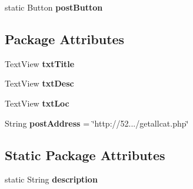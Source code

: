 \begin{DoxyCompactItemize}
\begin{DoxyCompactItemize}
\item 
\hypertarget{classcom_1_1example_1_1sel_1_1lostfound_1_1PostFragment_ab2d93225b515c22ccd209e1382e1a4a1}{static \-Button {\bfseries post\-Button}}\label{classcom_1_1example_1_1sel_1_1lostfound_1_1PostFragment_ab2d93225b515c22ccd209e1382e1a4a1}

\end{DoxyCompactItemize}
\subsection*{\-Package \-Attributes}
\begin{DoxyCompactItemize}
\item 
\hypertarget{classcom_1_1example_1_1sel_1_1lostfound_1_1PostFragment_a273b76da45350a34e1e2fa02b9d6f6db}{\-Text\-View {\bfseries txt\-Title}}\label{classcom_1_1example_1_1sel_1_1lostfound_1_1PostFragment_a273b76da45350a34e1e2fa02b9d6f6db}

\item 
\hypertarget{classcom_1_1example_1_1sel_1_1lostfound_1_1PostFragment_af19ec2e8119f96d9f6de337f643c4ff6}{\-Text\-View {\bfseries txt\-Desc}}\label{classcom_1_1example_1_1sel_1_1lostfound_1_1PostFragment_af19ec2e8119f96d9f6de337f643c4ff6}

\item 
\hypertarget{classcom_1_1example_1_1sel_1_1lostfound_1_1PostFragment_a46b9bddf221f741a2e05b1fdb0334f10}{\-Text\-View {\bfseries txt\-Loc}}\label{classcom_1_1example_1_1sel_1_1lostfound_1_1PostFragment_a46b9bddf221f741a2e05b1fdb0334f10}

\item 
\hypertarget{classcom_1_1example_1_1sel_1_1lostfound_1_1PostFragment_a379b6033757082f79dd454aefc0ded0f}{\-String {\bfseries post\-Address} = \char`\"{}http\-://52.../getallcat.\-php\char`\"{}}\label{classcom_1_1example_1_1sel_1_1lostfound_1_1PostFragment_a379b6033757082f79dd454aefc0ded0f}

\end{DoxyCompactItemize}
\subsection*{\-Static \-Package \-Attributes}
\begin{DoxyCompactItemize}
\item 
\hypertarget{classcom_1_1example_1_1sel_1_1lostfound_1_1PostFragment_ab9c26a485846eb2c7c353939eb2f5674}{static \-String {\bfseries description}}\label{classcom_1_1example_1_1sel_1_1lostfound_1_1PostFragment_ab9c26a485846eb2c7c353939eb2f5674}


\end{DoxyCompactItemize}
\end{DoxyCompactItemize}
